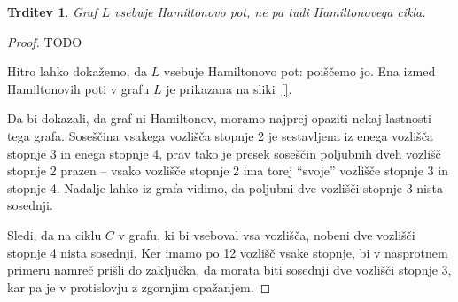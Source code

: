 \documentclass[12pt,a4paper]{amsart}
\theoremstyle{definition} %
\theoremstyle{plain} %
\newtheorem{trditev}[definicija]{Trditev}
\begin{document}
\bigskip

\begin{trditev}
    Graf $L$ vsebuje Hamiltonovo pot, ne pa tudi Hamiltonovega cikla.
\end{trditev}

\begin{proof}
    TODO
    
    Hitro lahko dokažemo, da $L$ vsebuje Hamiltonovo pot: poiščemo jo. Ena izmed Hamiltonovih poti v grafu $L$ je prikazana na sliki~\ref{}.
    
    Da bi dokazali, da graf ni Hamiltonov, moramo najprej opaziti nekaj lastnosti tega grafa. Soseščina vsakega vozlišča stopnje 2 je sestavljena iz enega vozlišča stopnje 3 in enega stopnje 4, prav tako je presek soseščin poljubnih dveh vozlišč stopnje 2 prazen -- vsako vozlišče stopnje 2 ima torej ``svoje'' vozlišče stopnje 3 in stopnje 4. Nadalje lahko iz grafa vidimo, da poljubni dve vozlišči stopnje 3 nista sosednji.
    
    Sledi, da na ciklu $C$ v grafu, ki bi vseboval vsa vozlišča, nobeni dve vozlišči stopnje 4 nista sosednji. Ker imamo po 12 vozlišč vsake stopnje, bi v nasprotnem primeru namreč prišli do zaključka, da morata biti sosednji dve vozlišči stopnje 3, kar pa je v protislovju z zgornjim opažanjem.
    

\end{proof}
\end{document}
